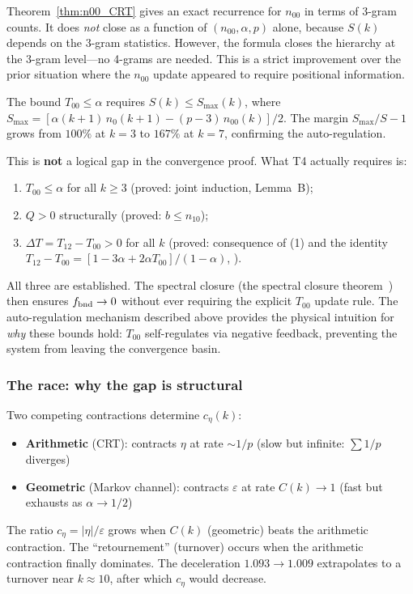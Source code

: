 \documentclass[12pt,a4paper]{article}
\begin{document}
\begin{remark}
\label{rem:T00_status}
Theorem~\ref{thm:n00_CRT} gives an exact recurrence for
$n_{00}$ in terms of 3-gram counts.  It does \emph{not} close as a
function of $(n_{00}, \alpha, p)$ alone, because $S(k)$ depends on
the 3-gram statistics.  However, the formula closes the hierarchy at
the 3-gram level---no 4-grams are needed.  This is a strict
improvement over the prior situation where the $n_{00}$ update
appeared to require positional information.

The bound $T_{00} \leq \alpha$ requires $S(k) \leq S_{\max}(k)$,
where $S_{\max} = [\alpha(k{+}1)\,n_0(k{+}1) - (p{-}3)\,n_{00}(k)]/2$.
The margin $S_{\max}/S - 1$ grows from $100\%$ at $k = 3$ to $167\%$
at $k = 7$, confirming the auto-regulation.

This is \textbf{not} a logical gap in the convergence proof.
What T4 actually requires is:
\begin{enumerate}[nosep]
\item $T_{00} \leq \alpha$ for all $k \geq 3$
  (proved: joint induction, Lemma~B);
\item $Q > 0$ structurally
  (proved: $b \leq n_{10}$);
\item $\Delta T = T_{12} - T_{00} > 0$ for all $k$
  (proved: consequence of (1) and the identity
  $T_{12} - T_{00} = [1 - 3\alpha + 2\alpha T_{00}]/(1-\alpha)$,
  ).
\end{enumerate}
All three are established. The spectral closure
(the spectral closure theorem~\cite{companion_M3}) then ensures $f_{\rm bnd} \to 0$
without ever requiring the explicit $T_{00}$ update rule.
The auto-regulation mechanism described above provides the physical
intuition for \emph{why} these bounds hold: $T_{00}$ self-regulates
via negative feedback, preventing the system from leaving the
convergence basin.
\end{remark}

\subsubsection{The race: why the gap is structural}

Two competing contractions determine $c_\eta(k)$:
\begin{itemize}[nosep]
\item \textbf{Arithmetic} (CRT): contracts $\eta$ at rate $\sim 1/p$
  (slow but infinite: $\sum 1/p$ diverges)
\item \textbf{Geometric} (Markov channel): contracts $\varepsilon$ at
  rate $C(k) \to 1$ (fast but exhausts as $\alpha \to 1/2$)
\end{itemize}
The ratio $c_\eta = |\eta|/\varepsilon$ grows when $C(k)$ (geometric)
beats the arithmetic contraction. The ``retournement'' (turnover)
occurs when the arithmetic contraction finally dominates. The
deceleration $1.093 \to 1.009$ extrapolates to a turnover near
$k \approx 10$, after which $c_\eta$ would decrease.
\end{document}
